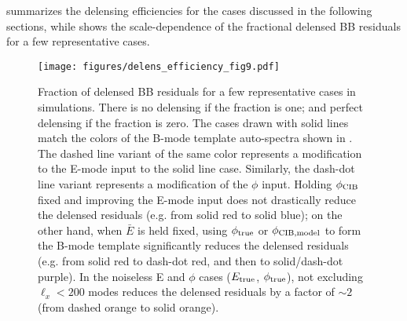  summarizes the delensing efficiencies for the cases discussed in the following sections,
while  shows the scale-dependence of the fractional delensed BB residuals for a few representative cases.


\begin{figure}
\begin{center}
\texttt{[image: figures/delens\_efficiency\_fig9.pdf]}
\caption{Fraction of delensed BB residuals for a few representative cases in simulations.
There is no delensing if the fraction is one; and perfect delensing if the fraction is zero.
The cases drawn with solid lines match the colors of the B-mode template auto-spectra shown in .
The dashed line variant of the same color represents a modification to the E-mode input to the solid line case.
Similarly, the dash-dot line variant represents a modification of the $\phi$ input.
Holding $\phi_{\rm CIB}$ fixed and improving the E-mode input does not drastically reduce the delensed residuals (e.g. from solid red to solid blue);
on the other hand, when $\bar{E}$ is held fixed, using $\phi_{\rm true}$ or $\phi_{\rm CIB, model}$ to form the B-mode template significantly reduces the delensed residuals (e.g. from solid red to dash-dot red, and then to solid/dash-dot purple).
In the noiseless E and $\phi$ cases ($E_{\rm true}$, $\phi_{\rm true}$), not excluding $\ell_x < 200$ modes reduces the delensed residuals by a factor of $\sim2$ (from dashed orange to solid orange).
}
\label{fig:deleff}
\end{center}
\end{figure}


